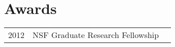 \documentclass[letterpaper]{deedy-resume} %
\begin{document}
\begin{minipage}[t]{0.66\textwidth}
\sectionspace









\section{Awards} 

\begin{tabular}{rll}
2012     & NSF Graduate Research Fellowship
\end{tabular}


\end{minipage}
\end{document}
